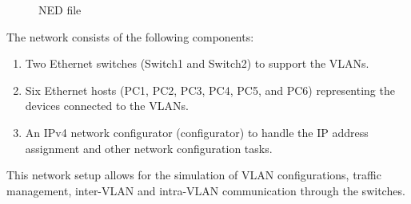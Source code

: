 \begin{qsolve}
\begin{qsolve}[]
\begin{figure}[H]
            \caption{NED file}
        \end{figure}
        The network consists of the following components:
        \begin{enumerate}
            \item Two Ethernet switches (Switch1 and Switch2) to support the VLANs.
            \item Six Ethernet hosts (PC1, PC2, PC3, PC4, PC5, and PC6) representing the devices connected to the VLANs.
            \item An IPv4 network configurator (configurator) to handle the IP address assignment and other network configuration tasks.
        \end{enumerate}
        This network setup allows for the simulation of VLAN configurations, traffic management, inter-VLAN and intra-VLAN communication through the switches.


\end{qsolve}
\end{qsolve}
